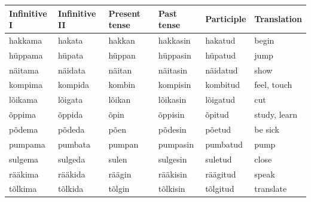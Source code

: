 \documentclass[a4paper, 12pt]{article}
\begin{document}
\begin{table}[H]
\begin{tabular}{llllll}
\toprule
\textbf{Infinitive I} & \textbf{Infinitive II} & \textbf{Present tense} & \textbf{Past tense} & \textbf{Participle} & \textbf{Translation} \\
\midrule
hakkama               & hakata                 & hakkan                 & hakkasin            & hakatud             & begin                \\
\addlinespace[0.2cm]
hüppama               & hüpata                 & hüppan                 & hüppasin            & hüpatud             & jump                 \\
\addlinespace[0.2cm]
näitama               & näidata                & näitan                 & näitasin            & näidatud            & show                 \\
\addlinespace[0.2cm]
kompima               & kompida                & kombin                 & kompisin            & kombitud            & feel, touch          \\
\addlinespace[0.2cm]
lõikama               & lõigata                & lõikan                 & lõikasin            & lõigatud            & cut                  \\
\addlinespace[0.2cm]
õppima                & õppida                 & õpin                   & õppisin             & õpitud              & study, learn         \\
\addlinespace[0.2cm]
põdema                & põdeda                 & põen                   & põdesin             & põetud              & be sick              \\
\addlinespace[0.2cm]
pumpama               & pumbata                & pumpan                 & pumpasin            & pumbatud            & pump                 \\
\addlinespace[0.2cm]
sulgema               & sulgeda                & sulen                  & sulgesin            & suletud             & close                \\
\addlinespace[0.2cm]
rääkima               & rääkida                & räägin                 & rääkisin            & räägitud            & speak                \\
\addlinespace[0.2cm]
tõlkima               & tõlkida                & tõlgin                 & tõlkisin            & tõlgitud            & translate           \\
\bottomrule
\end{tabular}
\end{table}
\end{document}
